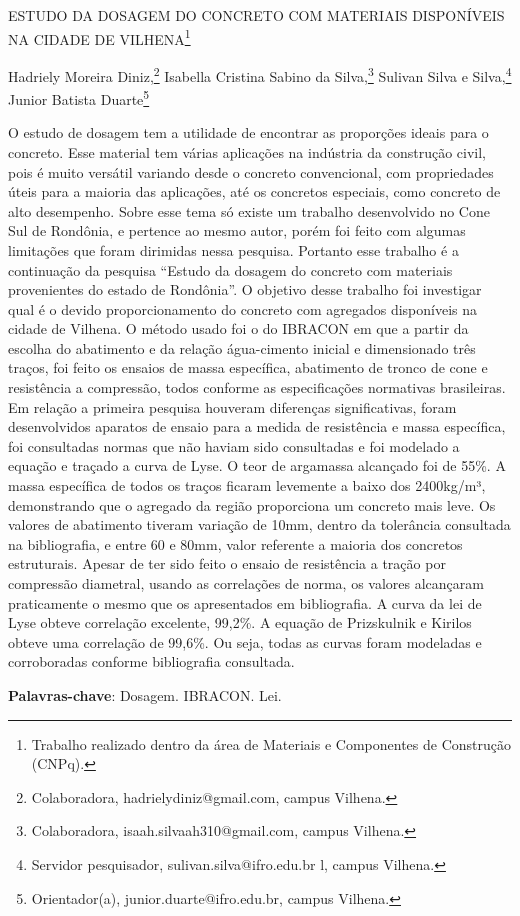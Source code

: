\documentclass[article,12pt,onesidea,4paper,english,brazil]{abntex2}
\begin{document}
	
	
	\frenchspacing 
	
	\begin{center}
		\LARGE ESTUDO DA DOSAGEM DO CONCRETO COM MATERIAIS DISPONÍVEIS NA CIDADE DE VILHENA\footnote{Trabalho realizado dentro da área de Materiais e Componentes de Construção (CNPq).}
		
		\normalsize
		Hadriely Moreira Diniz,\footnote{Colaboradora, hadrielydiniz@gmail.com, campus Vilhena.} 
		Isabella Cristina Sabino da Silva,\footnote{Colaboradora, isaah.silvaah310@gmail.com, campus Vilhena.} 
		Sulivan Silva e Silva,\footnote{Servidor pesquisador, sulivan.silva@ifro.edu.br l, campus Vilhena.} 
		Junior Batista Duarte\footnote{Orientador(a), junior.duarte@ifro.edu.br, campus Vilhena.} 
	\end{center}
	
	\noindent
	O estudo de dosagem tem a utilidade de encontrar as proporções ideais para o concreto. Esse material tem várias aplicações na indústria da construção civil, pois é muito versátil variando desde o concreto convencional, com propriedades úteis para a maioria das aplicações, até os concretos especiais, como concreto de alto desempenho. Sobre esse tema só existe um trabalho desenvolvido no Cone Sul de Rondônia, e pertence ao mesmo autor, porém foi feito com algumas limitações que foram dirimidas nessa pesquisa. Portanto esse trabalho é a continuação da pesquisa “Estudo da dosagem do concreto com materiais provenientes do estado de Rondônia”. O objetivo desse trabalho foi investigar qual é o devido proporcionamento do concreto com agregados disponíveis na cidade de Vilhena. O método usado foi o do IBRACON em que a partir da escolha do abatimento e da relação água-cimento inicial e dimensionado três traços, foi feito os ensaios de massa específica, abatimento de tronco de cone e resistência a compressão, todos conforme as especificações normativas brasileiras. Em relação a primeira pesquisa houveram diferenças significativas, foram desenvolvidos aparatos de ensaio para a medida de resistência e massa específica, foi consultadas normas que não haviam sido consultadas e foi modelado a equação e traçado a curva de Lyse. O teor de argamassa alcançado foi de 55\%. A massa específica de todos os traços ficaram levemente a baixo dos 2400kg/m³, demonstrando que o agregado da região proporciona um concreto mais leve. Os valores de abatimento tiveram variação de 10mm, dentro da tolerância consultada na bibliografia, e entre 60 e 80mm, valor referente a maioria dos concretos estruturais. Apesar de ter sido feito o ensaio de resistência a tração por compressão diametral, usando as correlações de norma, os valores alcançaram praticamente o mesmo que os apresentados em bibliografia. A curva da lei de Lyse obteve correlação excelente, 99,2\%. A equação de Prizskulnik e Kirilos obteve uma correlação de 99,6\%. Ou seja, todas as curvas foram modeladas e corroboradas conforme bibliografia consultada.
	
	\vspace{\onelineskip}
	
	\noindent
	\textbf{Palavras-chave}: Dosagem. IBRACON. Lei.
	
\end{document}
